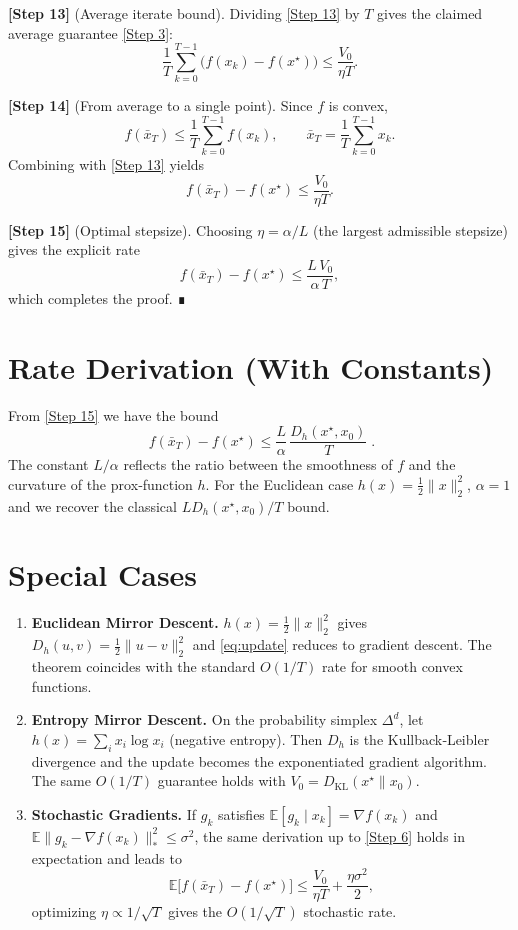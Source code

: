 \documentclass{article}
\newcommand{\grad}{\nabla}
\newcommand{\EE}{\mathbb{E}}
\begin{document}
\noindent\textbf{[Step 13]} (Average iterate bound).  
Dividing \eqref{Step 13} by $T$ gives the claimed average guarantee \eqref{Step 3}:
\[
\frac{1}{T}\sum_{k=0}^{T-1}\bigl(f(x_{k})-f(x^{\star})\bigr)\le\frac{V_{0}}{\eta T}.
\tag{19}
\]

\noindent\textbf{[Step 14]} (From average to a single point).  
Since $f$ is convex,
\[
f(\bar{x}_{T})\le\frac{1}{T}\sum_{k=0}^{T-1}f(x_{k}),
\qquad\bar{x}_{T}=\frac{1}{T}\sum_{k=0}^{T-1}x_{k}.
\]
Combining with \eqref{Step 13} yields
\[
f(\bar{x}_{T})-f(x^{\star})\le\frac{V_{0}}{\eta T}.
\tag{20}
\]

\noindent\textbf{[Step 15]} (Optimal stepsize).  
Choosing $\eta=\alpha/L$ (the largest admissible stepsize) gives the explicit rate
\[
f(\bar{x}_{T})-f(x^{\star})\le\frac{L\,V_{0}}{\alpha\,T},
\]
which completes the proof. ∎

\section*{Rate Derivation (With Constants)}
From \eqref{Step 15} we have the bound
\[
\boxed{ \; f(\bar{x}_{T})-f(x^{\star})\le \frac{L}{\alpha}\,\frac{D_{h}(x^{\star},x_{0})}{T}\; }.
\]
The constant $L/\alpha$ reflects the ratio between the smoothness of $f$ and the curvature of the prox‑function $h$. For the Euclidean case $h(x)=\frac12\|x\|_{2}^{2}$, $\alpha=1$ and we recover the classical $L D_{h}(x^{\star},x_{0})/T$ bound.

\section*{Special Cases}
\begin{enumerate}[label=\arabic*)]
\item \textbf{Euclidean Mirror Descent.} $h(x)=\frac12\|x\|_{2}^{2}$ gives $D_{h}(u,v)=\frac12\|u-v\|_{2}^{2}$ and \eqref{eq:update} reduces to gradient descent. The theorem coincides with the standard $O(1/T)$ rate for smooth convex functions.
\item \textbf{Entropy Mirror Descent.} On the probability simplex $\Delta^{d}$, let $h(x)=\sum_{i}x_{i}\log x_{i}$ (negative entropy). Then $D_{h}$ is the Kullback‑Leibler divergence and the update becomes the exponentiated gradient algorithm. The same $O(1/T)$ guarantee holds with $V_{0}=D_{\mathrm{KL}}(x^{\star}\|x_{0})$.
\item \textbf{Stochastic Gradients.} If $g_{k}$ satisfies $\EE[g_{k}\mid x_{k}]=\grad f(x_{k})$ and $\EE\|g_{k}-\grad f(x_{k})\|_{*}^{2}\le\sigma^{2}$, the same derivation up to \eqref{Step 6} holds in expectation and leads to
\[
\EE\bigl[f(\bar{x}_{T})-f(x^{\star})\bigr]\le\frac{V_{0}}{\eta T}+\frac{\eta\sigma^{2}}{2},
\]
optimizing $\eta\propto 1/\sqrt{T}$ gives the $O(1/\sqrt{T})$ stochastic rate.
\end{enumerate}
\end{document}
